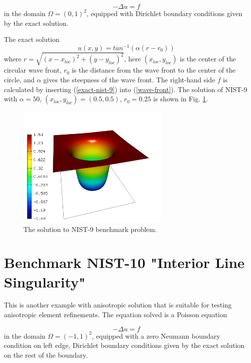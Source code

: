 \documentclass[12pt]{elsarticle}
\begin{document}
\begin{equation} \label{wave-front}
-\Delta u = f
\end{equation}
in the domain $\Omega = (0, 1)^2$, equipped with Dirichlet boundary conditions
given by the exact solution.

The exact solution
\begin{equation}\label{exact-nist-9}
u(x, y) = tan^{-1}(\alpha (r - r_{0}))
\end{equation}
where $r = \sqrt{(x - x_{loc})^{2} + (y - y_{loc})^{2}}$,
here $(x_{loc}, y_{loc})$ is the center of the circular wave front,
$r_{0}$ is the distance from the wave front to the center of the circle,
and $\alpha$ gives the steepness of the wave front.
The right-hand side $f$ is calculated by inserting (\ref{exact-nist-9}) into (\ref{wave-front}).
The solution of NIST-9 with $\alpha = 50$, $(x_{loc}, y_{loc}) = (0.5, 0.5)$,
$r_{0} = 0.25$ is shown in Fig. \ref{fig:sln-nist09}.

\begin{figure}[!ht]
\centering
\includegraphics[height=6cm]{nist/nist-9/solution.png}
\caption{The solution to NIST-9 benchmark problem.}
\label{fig:sln-nist09}
\end{figure}

\section{Benchmark NIST-10 "Interior Line Singularity"}
\label{sec:bench-10}

This is another example with anisotropic solution that is suitable for testing
anisotropic element refinements.
The equation solved is a Poisson equation

\begin{equation} \label{interior}
-\Delta u = f
\end{equation}
in the domain $\Omega = (-1, 1)^2$, equipped with a zero
Neumann boundary condition on left edge, Dirichlet boundary conditions given by the
exact solution on the rest of the boundary.
\end{document}
